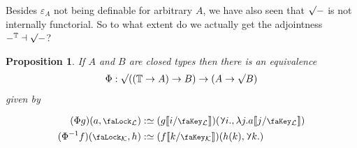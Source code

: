 \documentclass[10pt]{article}
\newtheorem{proposition}[theorem]{Proposition}
\theoremstyle{definition}
\let\oldequiv\equiv%
\renewcommand{\equiv}{\simeq}
\newcommand{\defeq}{\oldequiv}
\newcommand{\lock}{\mathchoice {\scalebox{0.8}{\text{\faLock}}}
  {\scalebox{0.8}{\text{\faLock}}} {\scalebox{0.5}{\text{\faLock}}}
  {\scalebox{0.4}{\text{\faLock}}} }
\newcommand{\key}{\mathchoice
  {\scalebox{0.8}{\text{\faKey}}} {\scalebox{0.8}{\text{\faKey}}}
  {\scalebox{0.5}{\text{\faKey}}} {\scalebox{0.4}{\text{\faKey}}} }
\newcommand{\rbindsym}{\raisebox{-0.5pt}{\scalerel*{\reflectbox{\rotatebox[origin=c]{185}{$\lambda$}}}{\lambda}}}
\newcommand{\rbind}[1]{\rbindsym{} #1.}
\newcommand{\Tiny}{\mathbb{T}}
\newcommand{\lockn}[1]{\mathcal{#1}}
\newcommand{\varkeye}[2]{\key_{#1}^{#2}}
\newcommand{\varkey}[2]{\varkeye{\lockn{#1}}{#2}}
\newcommand{\ctxlocke}[1]{\lock_{#1}}
\newcommand{\ctxlock}[1]{\ctxlocke{\lockn{#1}}}
\newcommand{\stubra}[1]{\llbracket #1 \rrbracket}
\newcommand{\substucke}[2]{\stubra{#1/\key_{#2}}}
\newcommand{\substuck}[2]{\substucke{#1}{\lockn{#2}}}
\newcommand{\rformu}[1]{\ThisStyle{\raisebox{0.07em}{$\SavedStyle \surd$}} #1}
\newcommand{\rintroe}[2]{\lock_{#1}. #2}
\newcommand{\rintro}[2]{\rintroe{\lockn{#1}}{#2}}
\newcommand{\relim}[1]{\rbindsym #1}
\newcommand{\rget}[1]{{#1}_{\downharpoonleft}}
\begin{document}
Besides $\varepsilon_A$ not being definable for arbitrary $A$, we have
also seen that $\rformu -$ is not internally functorial. So to what
extent do we actually get the adjointness $-^{\Tiny} \dashv \rformu -$?
\begin{proposition}
  If $A$ and $B$ are closed types then there is an equivalence
  \begin{align*}
    \Phi : \rformu ((\Tiny \to A) \to B) \to (A \to \rformu B)
  \end{align*}
  given by


  \begin{alignat*}{2}
    (\Phi g)(a, \ctxlock{L})
    &:\defeq (g\substuck{i}{L})(\rbind{i}, \lambda j. a \substuck{j}{L}) \\
    (\Phi^{-1} f)(\ctxlock{K}, h)
    &:\defeq (f\substuck{k}{K})(h(k), \rbind{k})
  \end{alignat*}
\end{proposition}
\end{document}
